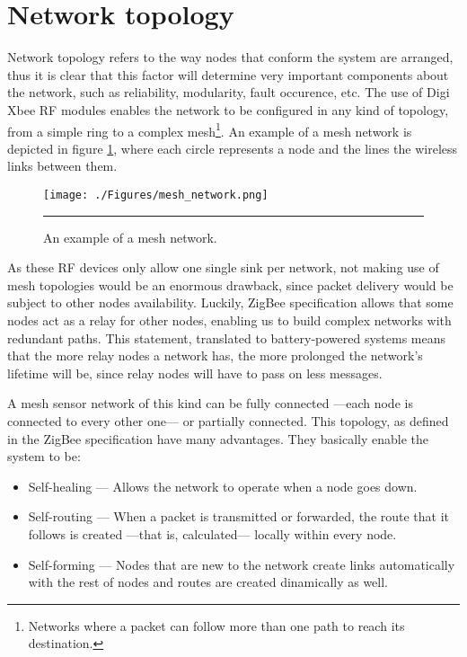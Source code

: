 \section{Network topology}

Network topology refers to the way nodes that conform the system are arranged, thus it is clear that this factor will determine very important components about the network, such as reliability, modularity, fault occurence, etc. The use of Digi Xbee\textregistered{} RF modules enables the network to be configured in any kind of topology, from a simple ring to a complex mesh\footnote{Networks where a packet can follow more than one path to reach its destination.}. An example of a mesh network is depicted in figure \ref{fig:MeshNet}, where each circle represents a node and the lines the wireless links between them.

\begin{figure}[htbp]
    \centering
        \texttt{[image: ./Figures/mesh\_network.png]}
        \rule{35em}{0.5pt}
    \caption[Mesh Network]{An example of a mesh network.}
    \label{fig:MeshNet}
\end{figure}

As these RF devices only allow one single sink per network, not making use of mesh topologies would be an enormous drawback, since packet delivery would be subject to other nodes availability. Luckily, ZigBee specification allows that some nodes act as a relay for other nodes, enabling us to build complex networks with redundant paths. This statement, translated to battery-powered systems means that the more relay nodes a network has, the more prolonged the network's lifetime will be\citep{hou2005energy}, since relay nodes will have to pass on less messages.


A mesh sensor network of this kind can be fully connected ---each node is connected to every other one--- or partially connected. This topology, as defined in the ZigBee specification have many advantages. They basically enable the system to be:

\begin{itemize}
    \item Self-healing --- Allows the network to operate when a node goes down.
    \item Self-routing --- When a packet is transmitted or forwarded, the route that it follows is created ---that is, calculated--- locally within every node.
    \item Self-forming --- Nodes that are new to the network create links automatically with the rest of nodes and routes are created dinamically as well.
\end{itemize}

